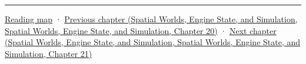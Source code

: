 \begin{center}\rule{0.5\linewidth}{0.5pt}\end{center}

\hyperref[volume-reading-map]{Reading map} · \href{../05-Spatial-Worlds-Engine-State-and-Simulation/main.pdf\#nameddest=06-engine-ii-ch029-dynamic-spatial-indices-for-moving-worlds}{Previous chapter (Spatial Worlds, Engine State, and Simulation, Spatial Worlds, Engine State, and Simulation, Chapter 20)} · \href{../05-Spatial-Worlds-Engine-State-and-Simulation/main.pdf\#nameddest=06-engine-ii-ch031-spatial-index-serialization-and-query-evidence}{Next chapter (Spatial Worlds, Engine State, and Simulation, Spatial Worlds, Engine State, and Simulation, Chapter 21)}

